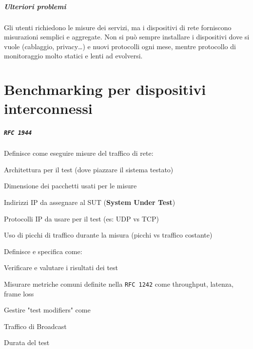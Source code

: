 \documentclass[10pt]{book}
\begin{document}
\paragraph{Ulteriori problemi} Gli utenti richiedono le misure dei servizi, ma i dispositivi di rete forniscono misurazioni semplici e aggregate. Non si può sempre installare i dispositivi dove si vuole (cablaggio, privacy\ldots) e nuovi protocolli ogni mese, mentre protocollo di monitoraggio molto statici e lenti ad evolversi.
\chapter{Benchmarking per dispositivi interconnessi}
\paragraph{\texttt{RFC 1944}} Definisce come eseguire misure del traffico di rete:
\begin{list}{-}{}
	\item Architettura per il test (dove piazzare il sistema testato)
	\item Dimensione dei pacchetti usati per le misure
	\item Indirizzi IP da assegnare al SUT (\textbf{System Under Test})
	\item Protocolli IP da usare per il test (es: UDP vs TCP)
	\item Uso di picchi di traffico durante la misura (picchi vs traffico costante)
\end{list}
Definisce e specifica come:
\begin{list}{-}{}
	\item Verificare e valutare i risultati dei test
	\item Misurare metriche comuni definite nella \texttt{RFC 1242} come throughput, latenza, frame loss
	\item Gestire "test modifiers" come
	\begin{list}{-}{}
		\item Traffico di Broadcast
		\item Durata del test
	\end{list}
\end{list}
\end{document}

